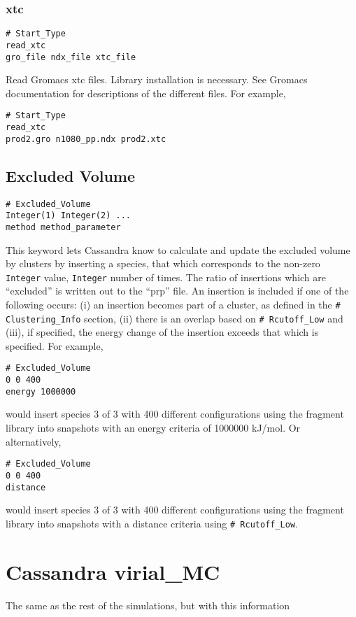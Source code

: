 \documentclass[12pt,twoside]{article}
\begin{document}
\subsubsection{xtc}
\begin{verbatim}
# Start_Type
read_xtc
gro_file ndx_file xtc_file
\end{verbatim}
Read Gromacs xtc files. Library installation is necessary.  See Gromacs documentation for descriptions of the different files.
\newline\noindent For example,
\begin{verbatim}
# Start_Type
read_xtc
prod2.gro n1080_pp.ndx prod2.xtc
\end{verbatim}
\subsection{Excluded Volume}
\begin{verbatim}
# Excluded_Volume
Integer(1) Integer(2) ...
method method_parameter
\end{verbatim}
This keyword lets Cassandra know to calculate and update the excluded volume by clusters by inserting a species, that which corresponds to the non-zero \texttt{Integer} value, \texttt{Integer} number of times. The ratio of insertions which are ``excluded'' is written out to the ``prp'' file.  An insertion is included if one of the following occurs: (i) an insertion becomes part of a cluster, as defined in the \texttt{\# Clustering\_Info} section, (ii) there is an overlap based on \texttt{\# Rcutoff\_Low} and (iii), if specified, the energy change of the insertion exceeds that which is specified.
\newline\noindent For example,
\begin{verbatim}
# Excluded_Volume
0 0 400 
energy 1000000
\end{verbatim}
would insert species 3 of 3 with 400 different configurations using the fragment library into snapshots with an energy criteria of 1000000 kJ/mol. Or alternatively,
\begin{verbatim}
# Excluded_Volume
0 0 400 
distance
\end{verbatim}
would insert species 3 of 3 with 400 different configurations using the fragment library into snapshots with a distance criteria using \texttt{\# Rcutoff\_Low}.

\section{Cassandra virial\_MC}
The same as the rest of the simulations, but with this information
\end{document}
